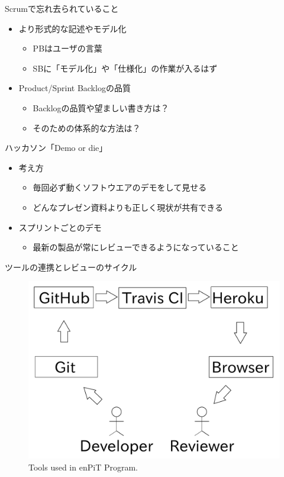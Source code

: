 \documentclass[t]{beamer}
\begin{document}
\begin{frame}[label=sec-9]{Scrumで忘れ去られていること}
\begin{itemize}
\item より形式的な記述やモデル化
\begin{itemize}
\item PBはユーザの言葉
\item SBに「モデル化」や「仕様化」の作業が入るはず
\end{itemize}
\item Product/Sprint Backlogの品質
\begin{itemize}
\item Backlogの品質や望ましい書き方は？
\item そのための体系的な方法は？
\end{itemize}
\end{itemize}
\end{frame}

\begin{frame}[label=sec-10]{ハッカソン「Demo or die」}
\begin{itemize}
\item 考え方
\begin{itemize}
\item 毎回必ず動くソフトウエアのデモをして見せる
\item どんなプレゼン資料よりも正しく現状が共有できる
\end{itemize}
\item スプリントごとのデモ
\begin{itemize}
\item 最新の製品が常にレビューできるようになっていること
\end{itemize}
\end{itemize}
\end{frame}

\begin{frame}[label=sec-11]{ツールの連携とレビューのサイクル}
\begin{figure}[htb]
\centering
\includegraphics[width=.75\linewidth]{./tools.pdf}
\caption{\label{fig:tools}Tools used in enPiT Program.}
\end{figure}
\end{frame}
\end{document}

